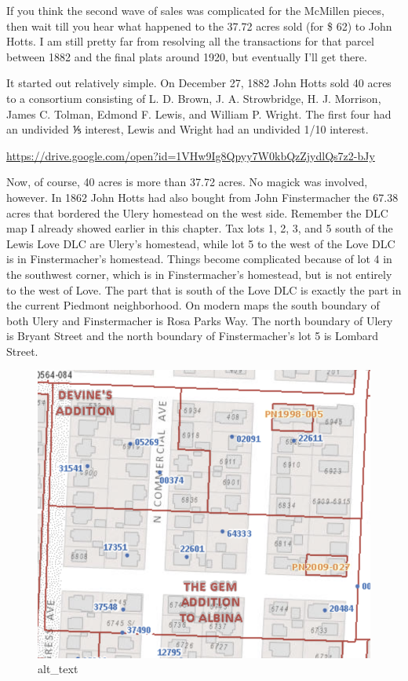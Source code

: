 \documentclass[
  12pt,
]{book}
\begin{document}
If you think the second wave of sales was complicated for the McMillen pieces, then wait till you hear what happened to the 37.72 acres sold (for \$ 62) to John Hotts. I am still pretty far from resolving all the transactions for that parcel between 1882 and the final plats around 1920, but eventually I'll get there.

It started out relatively simple. On December 27, 1882 John Hotts sold 40 acres to a consortium consisting of L. D. Brown, J. A. Strowbridge, H. J. Morrison, James C. Tolman, Edmond F. Lewis, and William P. Wright. The first four had an undivided ⅕ interest, Lewis and Wright had an undivided 1/10 interest.

\url{https://drive.google.com/open?id=1VHw9Ig8Qpyy7W0kbQzZjydlQs7z2-bJy}

Now, of course, 40 acres is more than 37.72 acres. No magick was involved, however. In 1862 John Hotts had also bought from John Finstermacher the 67.38 acres that bordered the Ulery homestead on the west side. Remember the DLC map I already showed earlier in this chapter. Tax lots 1, 2, 3, and 5 south of the Lewis Love DLC are Ulery's homestead, while lot 5 to the west of the Love DLC is in Finstermacher's homestead. Things become complicated because of lot 4 in the southwest corner, which is in Finstermacher's homestead, but is not entirely to the west of Love. The part that is south of the Love DLC is exactly the part in the current Piedmont neighborhood. On modern maps the south boundary of both Ulery and Finstermacher is Rosa Parks Way. The north boundary of Ulery is Bryant Street and the north boundary of Finstermacher's lot 5 is Lombard Street.

\begin{figure}
\centering
\includegraphics{images/0202a_images/image10.png}
\caption{alt\_text}
\end{figure}
\end{document}
